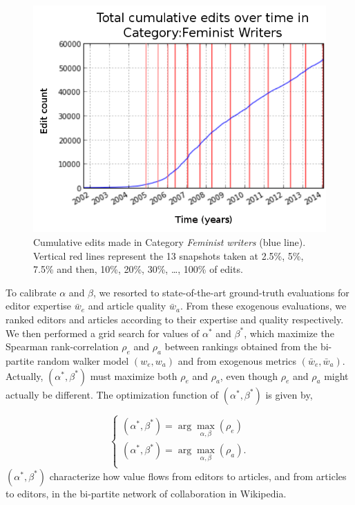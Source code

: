 \begin{figure}[!t]
\centering
\includegraphics[width=0.9\columnwidth]{../Figures/cumulative_snapshots_Feminist_Writers_thirteen.png}
\caption{Cumulative edits made in Category {\it Feminist writers} (blue line). Vertical red lines represent the 13 snapshots taken at 2.5\%, 5\%, 7.5\% and then, 10\%, 20\%, 30\%, \ldots , 100\% of edits.}
\label{fig:snapshots}
\end{figure}

To calibrate $\alpha$ and $\beta$, we resorted to state-of-the-art ground-truth evaluations for editor expertise $\bar{w}_e$ and article quality $\bar{w}_a$. From these exogenous evaluations, we ranked editors and articles according to their expertise and quality respectively. We then performed  a grid search for values of $\alpha^*$ and $\beta^*$, which maximize the Spearman rank-correlation $\rho_e$ and $\rho_a$ between rankings obtained from the bi-partite random walker model $(w_e,w_a)$ and from exogenous metrics $(\bar{w}_e,\bar{w}_a)$. Actually, $(\alpha^*,\beta^*)$ must maximize both $\rho_e$ and $\rho_a$, even though $\rho_e$ and $\rho_a$ might actually be different. The optimization function  of $(\alpha^*,\beta^*)$ is given by,

\newcommand{\argmax}{\arg\!\max}

\begin{equation}
\begin{cases}
(\alpha^*,\beta^*) = \argmax_{\alpha, \beta}(\rho_e)\\
(\alpha^*,\beta^*) =\argmax_{\alpha, \beta}(\rho_a).\\
\end{cases}
\end{equation}
$(\alpha^*,\beta^*)$ characterize how value flows from editors to articles, and from articles to editors, in the bi-partite network of collaboration in Wikipedia.

